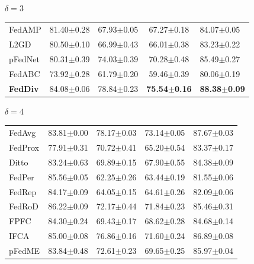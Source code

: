 \documentclass[journal]{IEEEtran}
\begin{document}
\begin{table}
\begin{subtable}[]{$\delta=3$}
\begin{tabular}{@{}lllcl@{}}
			FedAMP          & 81.40$\pm$0.28          & 67.93$\pm$0.05          & 67.27$\pm$0.18          & 84.07$\pm$0.05          \\
			L2GD            & 80.50$\pm$0.10          & 66.99$\pm$0.43          & 66.01$\pm$0.38          & 83.23$\pm$0.22          \\
			pFedNet         & 80.31$\pm$0.39          & 74.03$\pm$0.39          & 70.28$\pm$0.48          & 85.49$\pm$0.27          \\
			FedABC          & 73.92$\pm$0.28          & 61.79$\pm$0.20          & 59.46$\pm$0.39          & 80.06$\pm$0.19          \\
			\textbf{FedDiv} & 84.08$\pm$0.06          & 78.84$\pm$0.23          & \textbf{75.54$\pm$0.16} & \textbf{88.38$\pm$0.09} \\ \bottomrule
		\end{tabular}
	\end{subtable}
	\centering
	\begin{subtable}[]{$\delta=4$}
		\begin{tabular}{@{}lcccl@{}}
			\specialrule{0em}{3pt}{1pt}
			\toprule
			FedAvg          & 83.81$\pm$0.00          & 78.17$\pm$0.03 & 73.14$\pm$0.05          & 87.67$\pm$0.03 \\
			FedProx         & 77.91$\pm$0.31          & 70.72$\pm$0.41          & 65.20$\pm$0.54          & 83.37$\pm$0.17          \\
			Ditto           & 83.24$\pm$0.63          & 69.89$\pm$0.15          & 67.90$\pm$0.55          & 84.38$\pm$0.09          \\
			FedPer          & 85.56$\pm$0.05          & 62.25$\pm$0.26          & 63.44$\pm$0.19          & 81.55$\pm$0.06          \\
			FedRep          & 84.17$\pm$0.09          & 64.05$\pm$0.15          & 64.61$\pm$0.26          & 82.09$\pm$0.06          \\
			FedRoD          & 86.22$\pm$0.09          & 72.17$\pm$0.44          & 71.84$\pm$0.23          & 85.46$\pm$0.31          \\
			FPFC            & 84.30$\pm$0.24          & 69.43$\pm$0.17          & 68.62$\pm$0.28          & 84.68$\pm$0.14          \\
			IFCA            & 85.00$\pm$0.08          & 76.86$\pm$0.16          & 71.60$\pm$0.24          & 86.89$\pm$0.08          \\
			pFedME          & 83.84$\pm$0.48          & 72.61$\pm$0.23          & 69.65$\pm$0.25          & 85.97$\pm$0.04          \\

\end{tabular}
\end{subtable}
\end{table}
\end{document}
